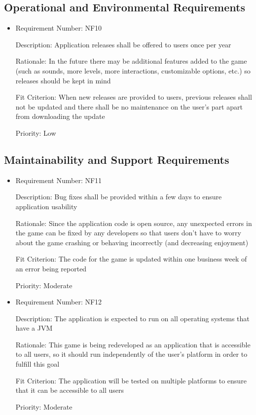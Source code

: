 \documentclass[12pt, titlepage]{article}
\begin{document}
\subsection{Operational and Environmental Requirements}
\begin{itemize}
	\item
	Requirement Number: NF10

	Description: Application releases shall be offered to users once per year

	Rationale: In the future there may be additional features added to the game (such as sounds, more levels, more interactions, customizable options, etc.) so releases should be kept in mind

	Fit Criterion: When new releases are provided to users, previous releases shall not be updated and there shall be no maintenance on the user's part apart from downloading the update

	Priority: Low

\end{itemize}

\subsection{Maintainability and Support Requirements}
\begin{itemize}
	\item
	Requirement Number: NF11

	Description: Bug fixes shall be provided within a few days to ensure application usability

	Rationale: Since the application code is open source, any unexpected errors in the game can be fixed by any developers so that users don't have to worry about the game crashing or behaving incorrectly (and decreasing enjoyment)

	Fit Criterion: The code for the game is updated within one business week of an error being reported

	Priority: Moderate

	\item
	Requirement Number: NF12

	Description: The application is expected to run on all operating systems that have a JVM

	Rationale: This game is being redeveloped as an application that is accessible to all users, so it should run independently of the user's platform in order to fulfill this goal

	Fit Criterion: The application will be tested on multiple platforms to ensure that it can be accessible to all users

	Priority: Moderate
\end{itemize}
\end{document}
